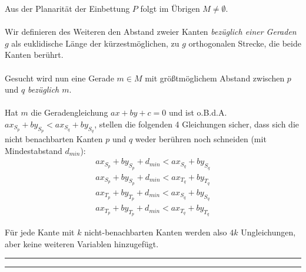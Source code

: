 \documentclass[a4paper,11pt]{amsart}
\begin{document}
\bigskip
\noindent Aus der Planarität der Einbettung $P$ folgt im Übrigen $M \ne \emptyset$.\\\\
Wir definieren des Weiteren den Abstand zweier Kanten \textit{bezüglich einer Geraden $g$} als euklidische Länge der kürzestmöglichen, zu $g$ orthogonalen Strecke, die beide Kanten berührt. \\\\
Gesucht wird nun eine Gerade $m \in M$ mit größtmöglichem Abstand zwischen $p$ und $q$ \textit{bezüglich $m$}.\\\\
Hat $m$ die Geradengleichung $ax + by + c = 0$ und ist o.B.d.A. $ax_S_p + by_S_p < ax_S_q + by_S_q$, stellen die folgenden 4 Gleichungen sicher, dass sich die nicht benachbarten Kanten $p$ und $q$ weder berühren noch schneiden (mit Mindestabstand $d_{min}$):
\bigskip
\begin{gather*}
ax_S_p + by_S_p + d_{min} < ax_S_q + by_S_q\\
ax_S_p + by_S_p + d_{min} < ax_T_q + by_T_q\\
ax_T_p + by_T_p + d_{min} < ax_S_q + by_S_q\\
ax_T_p + by_T_p + d_{min} < ax_T_q + by_T_q
\end{gather*}

\bigskip
\noindent Für jede Kante mit $k$ nicht-benachbarten Kanten werden also $4k$ Ungleichungen, aber keine weiteren Variablen hinzugefügt.
\bigskip
\hrule
\hrule


\bigskip
\bigskip
\bigskip
\end{document}
